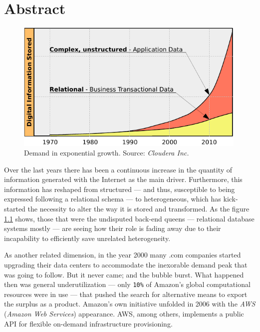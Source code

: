 \chapter{Abstract}\label{cap:intro}


\begin{figure}[tbp]
\begin{center}
\includegraphics[width=0.99\textwidth]{imagenes/001.pdf}
 \caption{Demand in exponential growth. Source: \emph{Cloudera Inc.}}
\label{fig:datagraph}
\end{center}
\end{figure}


\noindent Over the last years there has been a continuous increase in the quantity of information generated with the Internet as the main driver. Furthermore, this information has reshaped from structured --- and thus, susceptible to being expressed following a relational schema --- to heterogeneous, which has kick-started the necessity to alter the way it is stored and transformed. As the figure \ref{fig:datagraph} shows, those that were the undisputed back-end queens --- relational database systems mostly --- are seeing how their role is fading away due to their incapability to efficiently save unrelated heterogeneity.

As another related dimension, in the year 2000 many .com companies started upgrading their data centers to accommodate the inexorable demand peak that was going to follow. But it never came; and the bubble burst. What happened then was general underutilization --- only \texttt{10\%} of Amazon's global computational resources were in use --- that pushed the search for alternative means to export the surplus as a product. Amazon's own initiative unfolded in 2006 with the \emph{AWS} (\emph{Amazon Web Services}) appearance. AWS, among others, implements a public API for flexible on-demand infrastructure provisioning.

